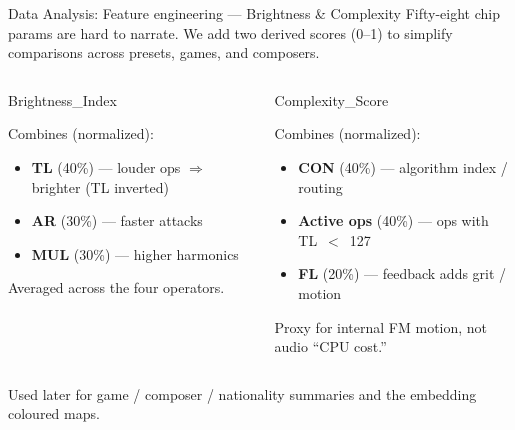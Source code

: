 \documentclass[aspectratio=169,11pt]{beamer}
\begin{document}
\begin{frame}{Data Analysis: Feature engineering --- Brightness \& Complexity}
  {\small Fifty-eight chip params are hard to narrate. We add two derived scores (0--1) to simplify comparisons across presets, games, and composers.}
  \vspace{1.5mm}
  \begin{columns}[T,onlytextwidth]
    \begin{block}{Brightness\_Index}
      {\scriptsize Combines (normalized):
      \begin{itemize}
        \item \textbf{TL} (40\%) --- louder ops $\Rightarrow$ brighter (TL inverted)
        \item \textbf{AR} (30\%) --- faster attacks
        \item \textbf{MUL} (30\%) --- higher harmonics
      \end{itemize}
      Averaged across the four operators.}
    \end{block}
    \begin{block}{Complexity\_Score}
      {\scriptsize Combines (normalized):
      \begin{itemize}
        \item \textbf{CON} (40\%) --- algorithm index / routing
        \item \textbf{Active ops} (40\%) --- ops with TL~$<$~127
        \item \textbf{FL} (20\%) --- feedback adds grit / motion
      \end{itemize}
      Proxy for internal FM motion, not audio ``CPU cost.''}
    \end{block}
  \end{columns}
  \vspace{2mm}
  {\scriptsize\color{kasserMuted}
  Used later for game / composer / nationality summaries and the embedding coloured maps.}
\end{frame}
\end{document}

